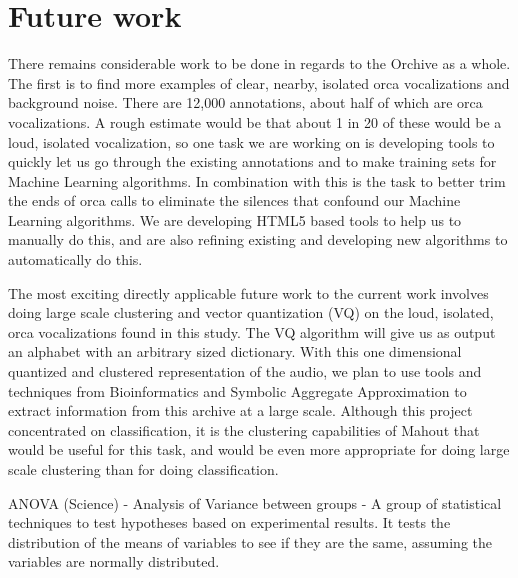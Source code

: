 \documentclass[12pt,oneside]{book}
\begin{document}
\section{Future work}

There remains considerable work to be done in regards to the Orchive
as a whole.  The first is to find more examples of clear, nearby,
isolated orca vocalizations and background noise.  There are 12,000
annotations, about half of which are orca vocalizations.  A rough
estimate would be that about 1 in 20 of these would be a loud,
isolated vocalization, so one task we are working on is developing
tools to quickly let us go through the existing annotations and to
make training sets for Machine Learning algorithms.  In combination
with this is the task to better trim the ends of orca calls to
eliminate the silences that confound our Machine Learning algorithms.
We are developing HTML5 based tools to help us to manually do this,
and are also refining existing and developing new algorithms to
automatically do this.

The most exciting directly applicable future work to the current work
involves doing large scale clustering and vector quantization (VQ) on
the loud, isolated, orca vocalizations found in this study.  The VQ
algorithm will give us as output an alphabet with an arbitrary sized
dictionary.  With this one dimensional quantized and clustered
representation of the audio, we plan to use tools and techniques from
Bioinformatics \cite{sarkar2002} and Symbolic Aggregate Approximation
\cite{lin07} to extract information from this archive at a large scale.
Although this project concentrated on classification, it is the
clustering capabilities of Mahout that would be useful for this task,
and would be even more appropriate for doing large scale clustering
than for doing classification.



\label{chapter:glossary}

ANOVA (Science) - Analysis of Variance between groups - A group of statistical techniques to test hypotheses based on experimental results.  It tests the distribution of the means of variables to see if they are the same, assuming the variables are normally distributed.
\\
\end{document}
